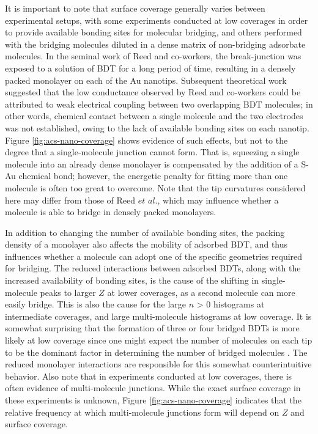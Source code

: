 \documentclass[10pt]{report}  %
\begin{document}
It is important to note that surface coverage generally varies between experimental setups, with some experiments conducted at low coverages in order to provide available bonding sites for molecular bridging, \cite{Tsutsui:2006,Horiguchi:2009,Haiss:2003,Haiss:2008,Haiss:2009} and others performed with the bridging molecules diluted in a dense matrix of non-bridging adsorbate molecules. \cite{Cui:2001,Fatemi:2011}  In the seminal work of Reed and co-workers, \cite{Reed:1997} the break-junction was exposed to a solution of BDT for a long period of time, resulting in a densely packed monolayer on each of the Au nanotips.  Subsequent theoretical work \cite{Emberly:2001} suggested that the low conductance observed by Reed and co-workers could be attributed to weak electrical coupling between two overlapping BDT molecules; in other words, chemical contact between a single molecule and the two electrodes was not established, owing to the lack of available bonding sites on each nanotip.  Figure \ref{fig:acs-nano-coverage} shows evidence of such effects, but not to the degree that a single-molecule junction cannot form.  That is, squeezing a single molecule into an already dense monolayer is compensated by the addition of a S-Au chemical bond; however, the energetic penalty for fitting more than one molecule is often too great to overcome.  Note that the tip curvatures considered here may differ from those of Reed $et$ $al.$, \cite{Reed:1997} which may influence whether a molecule is able to bridge in densely packed monolayers. 

In addition to changing the number of available bonding sites, the packing density of a monolayer also affects the mobility of adsorbed BDT, and thus influences whether a molecule can adopt one of the specific geometries required for bridging.  The reduced interactions between adsorbed BDTs, along with the increased availability of bonding sites, is the cause of the shifting in single-molecule peaks to larger $Z$ at lower coverages, as a second molecule can more easily bridge.  This is also the cause for the large $n$ > 0 histograms at intermediate coverages, and large multi-molecule histograms at low coverage.  It is somewhat surprising that the formation of three or four bridged BDTs is more likely at low coverage since one might expect the number of molecules on each tip to be the dominant factor in determining the number of bridged molecules \cite{Asar:2009}.  The reduced monolayer interactions are responsible for this somewhat counterintuitive behavior.  Also note that in experiments conducted at low coverages, there is often evidence of multi-molecule junctions. \cite{Tsutsui:2009,Haiss:2008,Haiss:2009}  While the exact surface coverage in these experiments is unknown, Figure \ref{fig:acs-nano-coverage} indicates that the relative frequency at which multi-molecule junctions form will depend on $Z$ and surface coverage.
\end{document}
